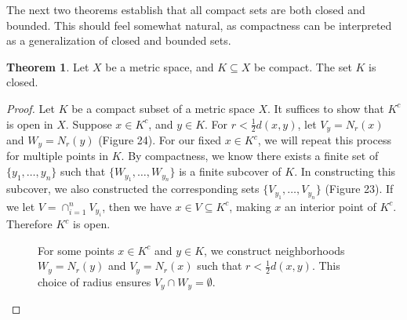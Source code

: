 \documentclass{article}
\theoremstyle{definition}
\newtheorem{theorem}{Theorem}[section]
\begin{document}
The next two theorems establish that all compact sets are both closed and bounded. This should feel somewhat natural, as compactness can be interpreted as a generalization of closed and bounded sets.
\begin{theorem}
	Let $ X $ be a metric space, and $ K\subseteq X $ be compact. The set $ K $ is closed. 
\end{theorem} 
\begin{proof}
Let $ K $ be a compact subset of a metric space $ X $. It suffices to show that $ K^c $ is open in $ X $. Suppose $ x\in K^c $, and $ y\in K $. For $ r<\frac{1}{2}d(x,y) $, let $ V_y=N_r(x) $ and $ W_y=N_r(y) $ (Figure 24). For our fixed $ x\in K^c $, we will repeat this process for multiple points in $ K $. By compactness, we know there exists a finite set of $ \{y_1,\ldots,y_n\} $ such that $ \{W_{y_1},\ldots,W_{y_n}\} $ is a finite subcover of $ K $. In constructing this subcover, we also constructed the corresponding sets $ \{V_{y_1},\ldots, V_{y_n}\} $ (Figure 23). If we let $ V=\cap_{i=1}^n V_{y_i} $, then we have $ x\in V\subseteq K^c $, making $ x $ an interior point of $ K^c $. Therefore $ K^c $ is open.
 \begin{figure}[h!]
	\centering
	\caption{For some points $ x\in K^c $ and $ y\in K $, we construct neighborhoods $ W_y=N_r(y)$ and $ V_y=N_r(x) $ such that $ r<\frac{1}{2}d(x,y) $. This choice of radius ensures $ V_y\cap W_y=\emptyset $.}  
\end{figure}
 \begin{figure}[h!]
	\centering
\end{figure}
\end{proof}
\end{document}
